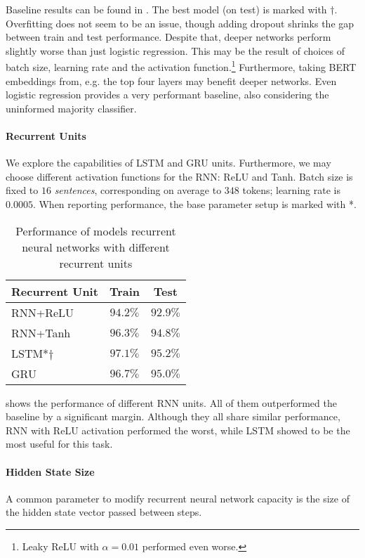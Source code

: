 \documentclass[11pt,a4paper]{article}
\newcommand{\dagg}{$\dagger{}$}
\begin{document}
Baseline results can be found in . The best model (on test) is marked with \dagg. Overfitting does not seem to be an issue, though adding dropout shrinks the gap between train and test performance. Despite that, deeper networks perform slightly worse than just logistic regression. This may be the result of choices of batch size, learning rate and the activation function.\footnote{Leaky ReLU with $\alpha=0.01$ performed even worse.} Furthermore, taking BERT embeddings from, e.g. the top four layers may benefit deeper networks. Even logistic regression provides a very performant baseline, also considering the uninformed majority classifier.

\paragraph{Recurrent Units}
We explore the capabilities of LSTM and GRU units. Furthermore, we may choose different activation functions for the RNN: ReLU and Tanh. Batch size is fixed to $16$ \textit{sentences}, corresponding on average to $348$ tokens; learning rate is $0.0005$. When reporting performance, the base parameter setup is marked with *.

\begin{table}[ht]
    \centering
    \begin{tabular}{lcc}
    \toprule
    Recurrent Unit & Train & Test \\
    \midrule
    RNN+ReLU & $94.2\%$ & $92.9\%$ \\
    RNN+Tanh & $96.3\%$ & $94.8\%$ \\
    LSTM*\dagg & $97.1\%$ & $95.2\%$ \\
    GRU & $96.7\%$ & $95.0\%$ \\
    \bottomrule
    \end{tabular}
    \caption{\label{tab:units} Performance of models recurrent neural networks with different recurrent units}
\end{table}

 shows the performance of different RNN units. All of them outperformed the baseline by a significant margin. Although they all share similar performance, RNN with ReLU activation performed the worst, while LSTM showed to be the most useful for this task.

\paragraph{Hidden State Size} 
A common parameter to modify recurrent neural network capacity is the size of the hidden state vector passed between steps.
\end{document}
